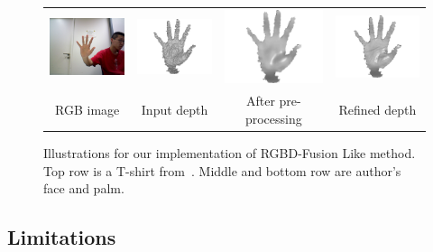 \begin{figure}[!ht]
{\begin{tabular}{c|c c c}
   \includegraphics[height = 0.19\linewidth]{figures/methodology/rgbd_palm_rgb.pdf} \hspace{0.05cm}
   &
   \includegraphics[height = 0.19\linewidth]{figures/methodology/rgbd_palm_shape_init.pdf} &
   \includegraphics[height = 0.19\linewidth]{figures/methodology/rgbd_palm_shape_smooth.pdf} &
   \includegraphics[height = 0.19\linewidth]{figures/methodology/rgbd_palm_shape.pdf} \\
      {RGB image} & {Input depth} & {After pre-processing} &{Refined depth}                 
 \end{tabular}}
\caption{Illustrations for our implementation of RGBD-Fusion Like method. Top row is a T-shirt from~\cite{han2013high}. Middle and bottom row are author's face and palm.  }
\label{fig:rgbd_illustration}
\end{figure}


\subsection{Limitations}

